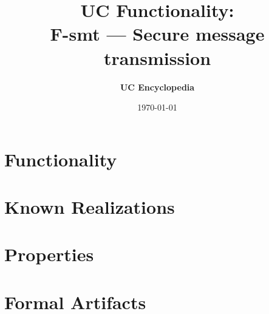 \documentclass[11pt,a4paper]{article}
\title{\textbf{\Large UC Functionality:}\\[0.2em] \Large F-smt --- Secure message transmission}
\author{\textbf{UC Encyclopedia}}
\date{\today}
\newtheorem{functionality}{Functionality}
\begin{document}
\maketitle

\begin{abstract}
\end{abstract}

\section{Functionality}

%

\section{Known Realizations}


\section{Properties}


\section{Formal Artifacts}

\end{document}
